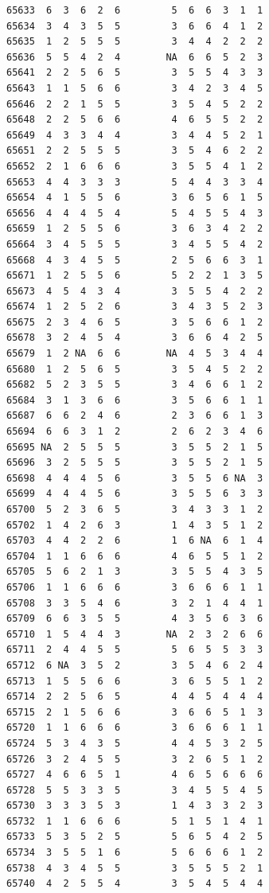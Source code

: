 \documentclass[
  letterpaper,
  DIV=11,
  numbers=noendperiod]{scrreprt}
\begin{document}
\begin{verbatim}
65633  6  3  6  2  6         5  6  6  3  1  1
65634  3  4  3  5  5         3  6  6  4  1  2
65635  1  2  5  5  5         3  4  4  2  2  2
65636  5  5  4  2  4        NA  6  6  5  2  3
65641  2  2  5  6  5         3  5  5  4  3  3
65643  1  1  5  6  6         3  4  2  3  4  5
65646  2  2  1  5  5         3  5  4  5  2  2
65648  2  2  5  6  6         4  6  5  5  2  2
65649  4  3  3  4  4         3  4  4  5  2  1
65651  2  2  5  5  5         3  5  4  6  2  2
65652  2  1  6  6  6         3  5  5  4  1  2
65653  4  4  3  3  3         5  4  4  3  3  4
65654  4  1  5  5  6         3  6  5  6  1  5
65656  4  4  4  5  4         5  4  5  5  4  3
65659  1  2  5  5  6         3  6  3  4  2  2
65664  3  4  5  5  5         3  4  5  5  4  2
65668  4  3  4  5  5         2  5  6  6  3  1
65671  1  2  5  5  6         5  2  2  1  3  5
65673  4  5  4  3  4         3  5  5  4  2  2
65674  1  2  5  2  6         3  4  3  5  2  3
65675  2  3  4  6  5         3  5  6  6  1  2
65678  3  2  4  5  4         3  6  6  4  2  5
65679  1  2 NA  6  6        NA  4  5  3  4  4
65680  1  2  5  6  5         3  5  4  5  2  2
65682  5  2  3  5  5         3  4  6  6  1  2
65684  3  1  3  6  6         3  5  6  6  1  1
65687  6  6  2  4  6         2  3  6  6  1  3
65694  6  6  3  1  2         2  6  2  3  4  6
65695 NA  2  5  5  5         3  5  5  2  1  5
65696  3  2  5  5  5         3  5  5  2  1  5
65698  4  4  4  5  6         3  5  5  6 NA  3
65699  4  4  4  5  6         3  5  5  6  3  3
65700  5  2  3  6  5         3  4  3  3  1  2
65702  1  4  2  6  3         1  4  3  5  1  2
65703  4  4  2  2  6         1  6 NA  6  1  4
65704  1  1  6  6  6         4  6  5  5  1  2
65705  5  6  2  1  3         3  5  5  4  3  5
65706  1  1  6  6  6         3  6  6  6  1  1
65708  3  3  5  4  6         3  2  1  4  4  1
65709  6  6  3  5  5         4  3  5  6  3  6
65710  1  5  4  4  3        NA  2  3  2  6  6
65711  2  4  4  5  5         5  6  5  5  3  3
65712  6 NA  3  5  2         3  5  4  6  2  4
65713  1  5  5  6  6         3  6  5  5  1  2
65714  2  2  5  6  5         4  4  5  4  4  4
65715  2  1  5  6  6         3  6  6  5  1  3
65720  1  1  6  6  6         3  6  6  6  1  1
65724  5  3  4  3  5         4  4  5  3  2  5
65726  3  2  4  5  5         3  2  6  5  1  2
65727  4  6  6  5  1         4  6  5  6  6  6
65728  5  5  3  3  5         3  4  5  5  4  5
65730  3  3  3  5  3         1  4  3  3  2  3
65732  1  1  6  6  6         5  1  5  1  4  1
65733  5  3  5  2  5         5  6  5  4  2  5
65734  3  5  5  1  6         5  6  6  6  1  2
65738  4  3  4  5  5         3  5  5  5  2  1
65740  4  2  5  5  4         3  5  4  5  4  4

\end{verbatim}
\end{document}
